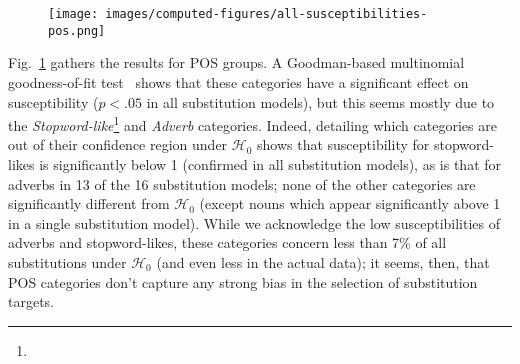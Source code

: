 \begin{figure}[h]
    \centering
    \texttt{[image: images/computed-figures/all-susceptibilities-pos.png]}
    \caption{
    }
    \label{fig:pos-susceptibilities}
\end{figure}



\medskip

\begin{new}

Fig.~\ref{fig:pos-susceptibilities} gathers the results for POS groups.
A Goodman-based multinomial goodness-of-fit test~\citep{goodman_simultaneous_1965} shows that these categories have a significant effect on susceptibility ($p < .05$ in all substitution models), but this seems mostly due to the \emph{Stopword-like}\footnote{
}
and \emph{Adverb} categories.
Indeed, detailing which categories are out of their confidence region under $\mathcal{H}_0$ shows that susceptibility for stopword-likes is significantly below 1 (confirmed in all substitution models), as is that for adverbs in 13 of the 16 substitution models;
none of the other categories are significantly different from $\mathcal{H}_0$ (except nouns which appear significantly above 1 in a single substitution model).
While we acknowledge the low susceptibilities of adverbs and stopword-likes, these categories concern less than 7\% of all substitutions under $\mathcal{H}_0$ (and even less in the actual data);
it seems, then, that POS categories don't capture any strong bias in the selection of substitution targets.

\end{new}

